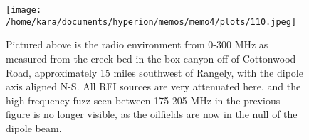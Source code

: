 \documentclass[11pt]{article}
\begin{document}
\begin{figure}[H]
    \begin{center}
    \texttt{[image: /home/kara/documents/hyperion/memos/memo4/plots/110.jpeg]}
    \end{center}
    \caption{
        Pictured above is the radio environment from 0-300 MHz as measured from 
        the creek bed in the box canyon off of Cottonwood Road, approximately 
        15 miles southwest of Rangely, with the dipole axis aligned N-S. All 
           RFI sources are very attenuated here, and the high frequency fuzz 
           seen between 175-205 MHz in the previous figure is no longer 
           visible, as the oilfields are now in the null of the dipole beam.
    }
    \label{fig:110}
\end{figure}
\end{document}
